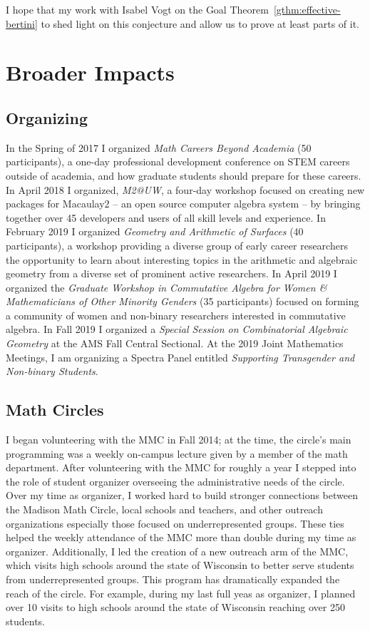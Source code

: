 \documentclass[10pt,reqno]{amsart}
\theoremstyle{remark}
\begin{document}
I hope that my work with Isabel Vogt on the Goal Theorem~\ref{gthm:effective-bertini} to shed light on this conjecture and allow us to prove at least parts of it. 


\section{Broader Impacts}



\subsection{Organizing}
In the Spring of 2017 I organized \textit{Math Careers Beyond Academia } (50 participants), a one-day professional development conference on STEM careers outside of academia, and how graduate students should prepare for these careers. In April 2018 I organized, \textit{M2@UW}, a four-day workshop focused on creating new packages for Macaulay2 -- an open source computer algebra system -- by bringing together over 45 developers and users of all skill levels and experience. In February 2019 I organized \textit{Geometry and Arithmetic of Surfaces} (40 participants), a workshop providing a diverse group of early career researchers the opportunity to learn about interesting topics in the arithmetic and algebraic geometry from a diverse set of prominent active researchers. In April 2019 I organized the \textit{Graduate Workshop in Commutative Algebra for Women \& Mathematicians of Other Minority Genders} (35 participants)  focused on forming a community of women and non-binary researchers interested in commutative algebra. In Fall 2019 I organized a \textit{Special Session on Combinatorial Algebraic Geometry} at the AMS Fall Central Sectional. At the 2019 Joint Mathematics Meetings, I am organizing a Spectra Panel entitled \textit{Supporting Transgender and Non-binary Students}. 

\subsection{Math Circles}
I began volunteering with the MMC in Fall 2014; at the time, the circle's main programming was a weekly on-campus lecture given by a member of the math department. After volunteering with the MMC for roughly a year I stepped into the role of student organizer overseeing the administrative needs of the circle. Over my time as organizer, I worked hard to build stronger connections between the Madison Math Circle, local schools and teachers, and other outreach organizations especially those focused on underrepresented groups. These ties helped the weekly attendance of the MMC more than double during my time as organizer. Additionally, I led the creation of a new outreach arm of the MMC, which visits high schools around the state of Wisconsin to better serve students from underrepresented groups. This program has dramatically expanded the reach of the circle. For example, during my last full yeas as organizer, I planned over 10 visits to high schools around the state of Wisconsin reaching over 250 students. 
\end{document}
